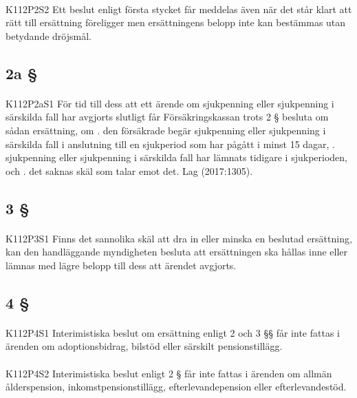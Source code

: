\documentclass[a4paper,notitlepage,openany,10pt]{book}
\begin{document}
\paragraph*{}
{\tiny K112P2S2}
Ett beslut enligt första stycket får meddelas även när det står klart att rätt till ersättning föreligger men ersättningens belopp inte kan bestämmas utan betydande dröjsmål.
\subsection*{2a §}
\paragraph*{}
{\tiny K112P2aS1}
För tid till dess att ett ärende om sjukpenning eller sjukpenning i särskilda fall har avgjorts slutligt får Försäkringskassan trots 2 § besluta om sådan ersättning, om
. den försäkrade begär sjukpenning eller sjukpenning i särskilda fall i anslutning till en sjukperiod som har pågått i minst 15 dagar,
. sjukpenning eller sjukpenning i särskilda fall har lämnats tidigare i sjukperioden, och
. det saknas skäl som talar emot det.
Lag (2017:1305).
\subsection*{3 §}
\paragraph*{}
{\tiny K112P3S1}
Finns det sannolika skäl att dra in eller minska en beslutad ersättning, kan den handläggande myndigheten besluta att ersättningen ska hållas inne eller lämnas med lägre belopp till dess att ärendet avgjorts.
\subsection*{4 §}
\paragraph*{}
{\tiny K112P4S1}
Interimistiska beslut om ersättning enligt 2 och 3 §§ får inte fattas i ärenden om adoptionsbidrag, bilstöd eller särskilt pensionstillägg.
\paragraph*{}
{\tiny K112P4S2}
Interimistiska beslut enligt 2 § får inte fattas i ärenden om allmän ålderspension, inkomstpensionstillägg, efterlevandepension eller efterlevandestöd.
\end{document}
